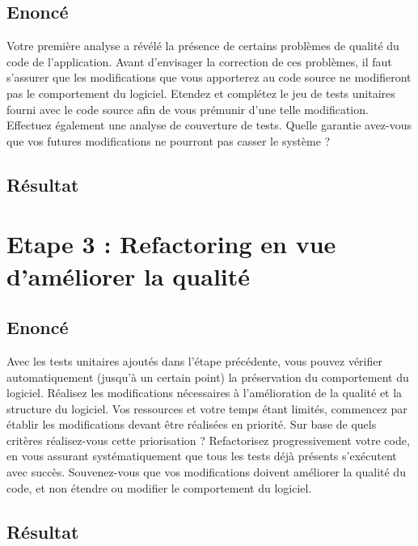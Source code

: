 \documentclass[12pt,a4paper,final]{article}
\begin{document}
\subsection{Enoncé}
Votre première analyse a révélé la présence de certains problèmes de qualité du code de l'application.
Avant d'envisager la correction de ces problèmes, il faut s'assurer que les modifications que vous apporterez au code source ne modifieront pas le comportement du logiciel.
Etendez et complétez le jeu de tests unitaires fourni avec le code source afin de vous prémunir d'une telle modification. Effectuez également une analyse de couverture de tests.
Quelle garantie avez-vous que vos futures modifications ne pourront pas casser le système ?

\subsection{Résultat}



\section{Etape 3 : Refactoring en vue d'améliorer la qualité}\label{sec:etape3}
\subsection{Enoncé}
Avec les tests unitaires ajoutés dans l'étape précédente, vous pouvez vérifier automatiquement (jusqu'à un certain point) la préservation du comportement du logiciel. Réalisez les modifications nécessaires à l'amélioration de la qualité et la structure du logiciel. 
Vos ressources et votre temps étant limités, commencez par établir les modifications devant être réalisées en priorité. Sur base de quels critères réalisez-vous cette priorisation ?
Refactorisez progressivement votre code, en vous assurant systématiquement que tous les tests déjà présents s'exécutent avec succès. Souvenez-vous que vos modifications doivent améliorer la qualité du code, et non étendre ou modifier le comportement du logiciel.

\subsection{Résultat}



\end{document}

